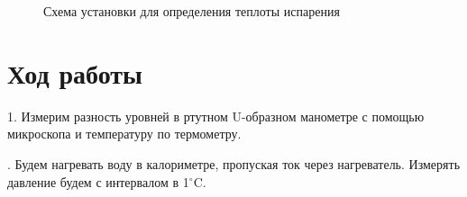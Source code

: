 \documentclass[a4paper,12pt]{article} %
\begin{document}
\begin{figure}[h]
	\caption{Схема установки для определения теплоты испарения}
\end{figure}

\medskip

\section{Ход работы}

1. Измерим разность уровней в ртутном U-образном манометре с помощью микроскопа и температуру по термометру.

\medskip

. Будем нагревать воду в калориметре, пропуская ток через нагреватель. Измерять давление будем с интервалом в 1$^\circ\text{C}$.

\medskip
\end{document}
